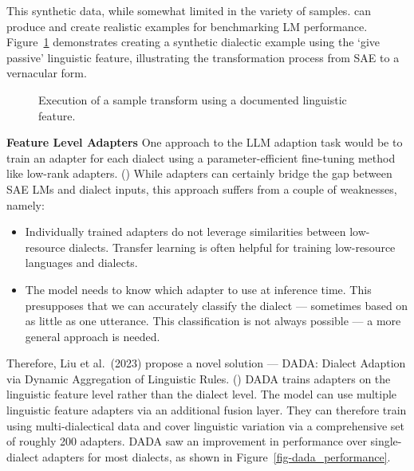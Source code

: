 \documentclass[
  letterpaper,
  numbers=noenddot,
  DIV=11]{scrreprt}
\theoremstyle{definition}
\theoremstyle{plain}
\theoremstyle{plain}
\theoremstyle{remark}
\begin{document}
This synthetic data, while somewhat limited in the variety of samples.
can produce and create realistic examples for benchmarking LM
performance. Figure~\ref{fig-synthetic_example} demonstrates creating a
synthetic dialectic example using the `give passive' linguistic feature,
illustrating the transformation process from SAE to a vernacular form.

\begin{figure}


\caption{\label{fig-synthetic_example}Execution of a sample transform
using a documented linguistic feature.}

\end{figure}%

\textbf{Feature Level Adapters} One approach to the LLM adaption task
would be to train an adapter for each dialect using a
parameter-efficient fine-tuning method like low-rank adapters.
() While adapters can certainly
bridge the gap between SAE LMs and dialect inputs, this approach suffers
from a couple of weaknesses, namely:

\begin{itemize}
\item
  Individually trained adapters do not leverage similarities between
  low-resource dialects. Transfer learning is often helpful for training
  low-resource languages and dialects.
\item
  The model needs to know which adapter to use at inference time. This
  presupposes that we can accurately classify the dialect --- sometimes
  based on as little as one utterance. This classification is not always
  possible --- a more general approach is needed.
\end{itemize}

Therefore, Liu et al.~(2023) propose a novel solution --- DADA: Dialect
Adaption via Dynamic Aggregation of Linguistic Rules.
() DADA trains adapters on
the linguistic feature level rather than the dialect level. The model
can use multiple linguistic feature adapters via an additional fusion
layer. They can therefore train using multi-dialectical data and cover
linguistic variation via a comprehensive set of roughly 200 adapters.
DADA saw an improvement in performance over single-dialect adapters for
most dialects, as shown in Figure~\ref{fig-dada_performance}.
\end{document}

